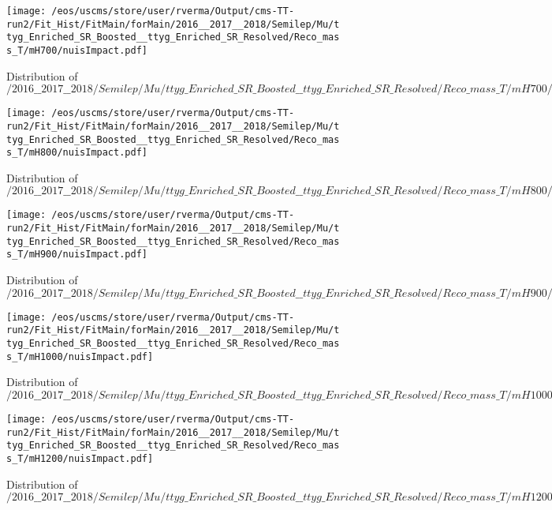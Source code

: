 \begin{figure}
\centering
\texttt{[image: /eos/uscms/store/user/rverma/Output/cms-TT-run2/Fit\_Hist/FitMain/forMain/2016\_\_2017\_\_2018/Semilep/Mu/ttyg\_Enriched\_SR\_Boosted\_\_ttyg\_Enriched\_SR\_Resolved/Reco\_mass\_T/mH700/nuisImpact.pdf]}
\caption{Distribution of $/2016\_\_2017\_\_2018/Semilep/Mu/ttyg\_Enriched\_SR\_Boosted\_\_ttyg\_Enriched\_SR\_Resolved/Reco\_mass\_T/mH700/nuisImpact.pdf$}
\end{figure}

\begin{figure}
\centering
\texttt{[image: /eos/uscms/store/user/rverma/Output/cms-TT-run2/Fit\_Hist/FitMain/forMain/2016\_\_2017\_\_2018/Semilep/Mu/ttyg\_Enriched\_SR\_Boosted\_\_ttyg\_Enriched\_SR\_Resolved/Reco\_mass\_T/mH800/nuisImpact.pdf]}
\caption{Distribution of $/2016\_\_2017\_\_2018/Semilep/Mu/ttyg\_Enriched\_SR\_Boosted\_\_ttyg\_Enriched\_SR\_Resolved/Reco\_mass\_T/mH800/nuisImpact.pdf$}
\end{figure}

\begin{figure}
\centering
\texttt{[image: /eos/uscms/store/user/rverma/Output/cms-TT-run2/Fit\_Hist/FitMain/forMain/2016\_\_2017\_\_2018/Semilep/Mu/ttyg\_Enriched\_SR\_Boosted\_\_ttyg\_Enriched\_SR\_Resolved/Reco\_mass\_T/mH900/nuisImpact.pdf]}
\caption{Distribution of $/2016\_\_2017\_\_2018/Semilep/Mu/ttyg\_Enriched\_SR\_Boosted\_\_ttyg\_Enriched\_SR\_Resolved/Reco\_mass\_T/mH900/nuisImpact.pdf$}
\end{figure}

\begin{figure}
\centering
\texttt{[image: /eos/uscms/store/user/rverma/Output/cms-TT-run2/Fit\_Hist/FitMain/forMain/2016\_\_2017\_\_2018/Semilep/Mu/ttyg\_Enriched\_SR\_Boosted\_\_ttyg\_Enriched\_SR\_Resolved/Reco\_mass\_T/mH1000/nuisImpact.pdf]}
\caption{Distribution of $/2016\_\_2017\_\_2018/Semilep/Mu/ttyg\_Enriched\_SR\_Boosted\_\_ttyg\_Enriched\_SR\_Resolved/Reco\_mass\_T/mH1000/nuisImpact.pdf$}
\end{figure}

\begin{figure}
\centering
\texttt{[image: /eos/uscms/store/user/rverma/Output/cms-TT-run2/Fit\_Hist/FitMain/forMain/2016\_\_2017\_\_2018/Semilep/Mu/ttyg\_Enriched\_SR\_Boosted\_\_ttyg\_Enriched\_SR\_Resolved/Reco\_mass\_T/mH1200/nuisImpact.pdf]}
\caption{Distribution of $/2016\_\_2017\_\_2018/Semilep/Mu/ttyg\_Enriched\_SR\_Boosted\_\_ttyg\_Enriched\_SR\_Resolved/Reco\_mass\_T/mH1200/nuisImpact.pdf$}
\end{figure}

